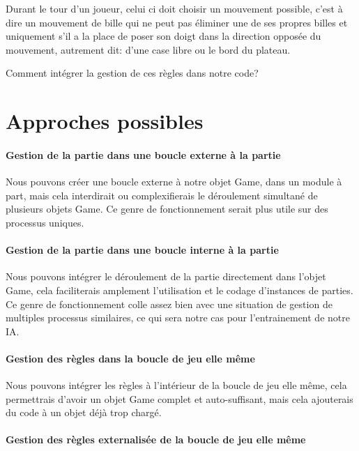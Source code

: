 \documentclass{scrreprt}
\begin{document}
			Durant le tour d'un joueur, celui ci doit choisir un mouvement possible, c'est à dire un mouvement de bille qui ne peut pas éliminer une de ses propres billes et uniquement s'il a la place de poser son doigt dans la direction opposée du mouvement, autrement dit: d'une case libre ou le bord du plateau.  
			
			Comment intégrer la gestion de ces règles dans notre code?
		
		\section{Approches possibles}
			
			\paragraph{Gestion de la partie dans une boucle externe à la partie}
			
			Nous pouvons créer une boucle externe à notre objet Game, dans un module à part, mais cela interdirait ou complexifierais le déroulement simultané de plusieurs objets Game. Ce genre de fonctionnement serait plus utile sur des processus uniques.
			
			\paragraph{Gestion de la partie dans une boucle interne à la partie}
			
			Nous pouvons intégrer le déroulement de la partie directement dans l'objet Game, cela faciliterais amplement l'utilisation et le codage d'instances de parties. Ce genre de fonctionnement colle assez bien avec une situation de gestion de multiples processus similaires, ce qui sera notre cas pour l'entrainement de notre IA.
			
			\paragraph{Gestion des règles dans la boucle de jeu elle même}
			
			Nous pouvons intégrer les règles à l'intérieur de la boucle de jeu elle même, cela permettrais d'avoir un objet Game complet et auto-suffisant, mais cela ajouterais du code à un objet déjà trop chargé. 
			
			\paragraph{Gestion des règles externalisée de la boucle de jeu elle même}
			
\end{document}
